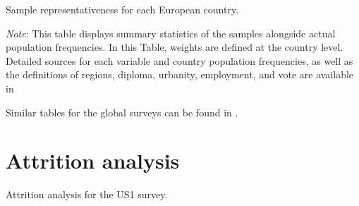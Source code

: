 \begin{table}[h]
    \caption[Sample representativeness of each Eu country]{Sample representativeness for each European country.} \label{tab:representativeness_EU}
    \makebox[\textwidth][c]{
        \resizebox*{!}{.50\textheight}{%
        
        }
    }
    {\footnotesize \textit{Note}: This table displays summary statistics of the samples alongside actual population frequencies. In this Table, weights are defined at the country level.  %
    Detailed sources for each variable and country population frequencies, as well as the definitions of regions, diploma, urbanity, employment, and vote are available in %
    }
\end{table}

Similar tables for the global surveys can be found in \citet{dechezlepretre_fighting_2022}.

\clearpage
\section{Attrition analysis}\label{app:attrition}

\begin{table}[h]\label{tab:attrition_US1}
    \caption[Attrition analysis: US1]{Attrition analysis for the US1 survey.} 
    \makebox[\textwidth][c]{
\resizebox*{!}{.73\textheight}{ %
        
        }
    }
    {\footnotesize %
    }
\end{table}

